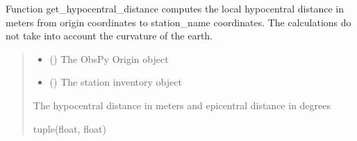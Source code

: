 \documentclass[letterpaper,10pt,english]{sphinxmanual}
\begin{document}

\begin{fulllineitems}
\label{\detokenize{api_core:core.utils.get_hypocentral_distance}}
\pysigstartsignatures
{}
\pysigstopsignatures
\sphinxAtStartPar
Function get\_hypocentral\_distance computes the local hypocentral distance in meters
from origin coordinates to station\_name coordinates.
The calculations do not take into account the curvature of the earth.
\begin{quote}\begin{description}
\begin{itemize}
\item {} 
\sphinxAtStartPar
{} () \textendash{} The ObsPy Origin object

\item {} 
\sphinxAtStartPar
{} () \textendash{} The station inventory object

\end{itemize}

\sphinxAtStartPar
The hypocentral distance in meters and epicentral distance in degrees

\sphinxAtStartPar
tuple(float, float)

\end{description}\end{quote}

\end{fulllineitems}

\end{document}
